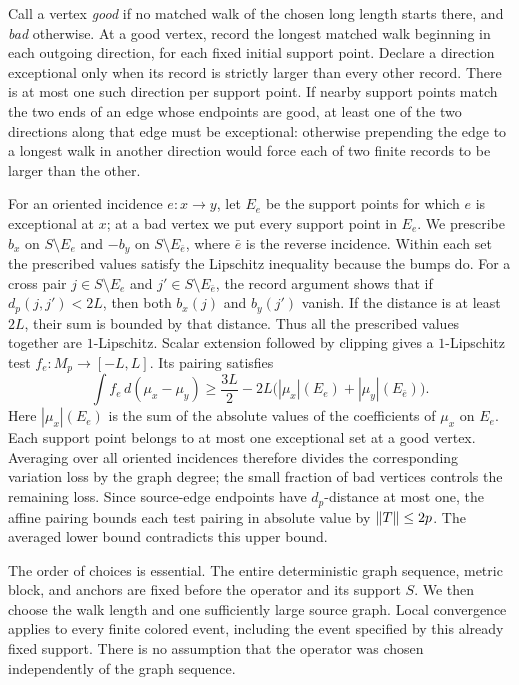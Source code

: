 Call a vertex \emph{good} if no matched walk of the chosen long length
starts there, and \emph{bad} otherwise. At a good vertex, record the longest matched walk
beginning in each outgoing direction, for each fixed
initial support point. Declare a direction exceptional only when its
record is strictly larger than every other record. There is at most
one such direction per support point. If nearby support points match
the two ends of an edge whose endpoints are good, at least one of the two directions along that
edge must be exceptional: otherwise prepending the edge to a longest
walk in another direction would force each of two finite records to be
larger than the other.

For an oriented incidence $e:x\to y$, let $E_e$ be the support points for
which $e$ is exceptional at $x$; at a bad vertex we put every support point
in $E_e$. We prescribe $b_x$ on $S\setminus E_e$ and $-b_y$ on
$S\setminus E_{\bar e}$, where $\bar e$ is the reverse incidence. Within
each set the prescribed values satisfy the Lipschitz inequality because
the bumps do. For a cross pair $j\in S\setminus E_e$ and
$j'\in S\setminus E_{\bar e}$, the record argument shows that if
$d_p(j,j')<2L$, then both $b_x(j)$ and $b_y(j')$ vanish. If the distance
is at least $2L$, their sum is bounded by that distance. Thus all the
prescribed values together are $1$-Lipschitz. Scalar extension followed by
clipping gives a $1$-Lipschitz test $f_e:M_p\to[-L,L]$. Its pairing satisfies
\[
 \int f_e\,d(\mu_x-\mu_y)
 \ge \frac{3L}{2}
 -2L\bigl(|\mu_x|(E_e)+|\mu_y|(E_{\bar e})\bigr).
\]
Here $|\mu_x|(E_e)$ is the sum of the absolute values of the coefficients
of $\mu_x$ on $E_e$. Each support point belongs to at most one exceptional
set at a good vertex. Averaging over all oriented incidences therefore
divides the corresponding variation loss by the graph degree; the small
fraction of bad vertices controls the remaining loss. Since source-edge
endpoints have $d_p$-distance at most one, the affine pairing bounds each
test pairing in absolute value by $\left\|T\right\|\le2p$. The averaged lower bound
contradicts this upper bound.

The order of choices is essential. The entire deterministic graph
sequence, metric block, and anchors are fixed before the operator and
its support $S$. We then choose the walk length and one sufficiently
large source graph. Local convergence applies to every finite colored
event, including the event specified by this already fixed support.
There is no assumption that the operator was chosen independently of
the graph sequence.

